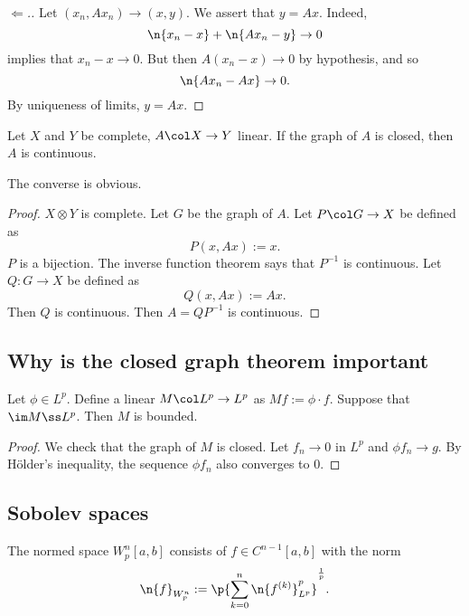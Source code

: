 \begin{proof}[$\Leftarrow$.]
  Let $(x_n, Ax_n) \to (x, y)$. We assert that $y = Ax$.
  Indeed,
  $$ \n{x_n-x}+\n{Ax_n-y} \to 0 $$
  implies that $x_n-x \to 0$.
  But then $A(x_n-x) \to 0$ by hypothesis, and so
  $$ \n{Ax_n -Ax} \to 0. $$
  By uniqueness of limits, $y = Ax$.
\end{proof}

\begin{theorem}
  Let $X$ and $Y$ be complete, $A \col X \to Y$ linear.
  If the graph of $A$ is closed, then $A$ is continuous.
\end{theorem}

The converse is obvious.

\begin{proof}
  $X \otimes Y$ is complete.
  Let $G$ be the graph of $A$.
  Let $P \col G \to X$ be defined as 
  $$ P(x, Ax) := x. $$
  $P$ is a bijection.
  The inverse function theorem says that $P^{-1}$ is continuous.
  Let $Q \colon G \to X$ be defined as
  $$ Q(x, Ax) := Ax. $$
  Then $Q$ is continuous.
  Then $A = Q P^{-1}$ is continuous.
\end{proof}

\subsection{Why is the closed graph theorem important}

\begin{lemma}
  Let $\phi \in L^p$.
  Define a linear $M \col L^p \to L^p$ as
  $ M f := \phi \cdot f$.
  Suppose that $\im M \ss L^p$.
  Then $M$ is bounded.
\end{lemma}

\begin{proof}
  We check that the graph of $M$ is closed.
  Let $f_n \to 0$ in $L^p$ and $\phi f_n \to g$.
  By Hölder's inequality, the sequence $\phi f_n$ also converges to 0.
\end{proof}

\subsection{Sobolev spaces}

\begin{definition}
  The normed space $W^n_p[a, b]$ consists of $f \in C^{n-1}[a,b]$ with the norm
  $$ \n{f}_{W^n_p} := \p{\sum_{k=0}^n \n{f^{(k)}}_{L^p}^p}^{\frac{1}{p}}. $$
\end{definition}

